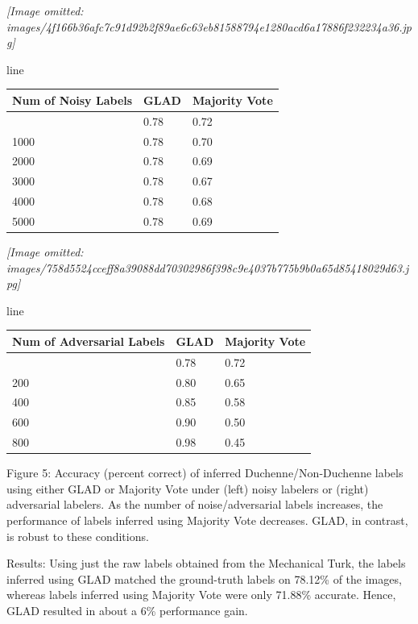\documentclass[
]{article}
\newcounter{none} %
\begin{document}
\textit{[Image omitted: images/4f166b36afc7c91d92b2f89ae6c63eb81588794e1280acd6a17886f232234a36.jpg]}

line

{\def\LTcaptype{none} %
\begin{longtable}[]{@{}lll@{}}
\toprule\noalign{}
Num of Noisy Labels & GLAD & Majority Vote \\
\midrule\noalign{}
\endhead
\bottomrule\noalign{}
\endlastfoot
0 & 0.78 & 0.72 \\
1000 & 0.78 & 0.70 \\
2000 & 0.78 & 0.69 \\
3000 & 0.78 & 0.67 \\
4000 & 0.78 & 0.68 \\
5000 & 0.78 & 0.69 \\
\end{longtable}
}

\textit{[Image omitted: images/758d5524cceff8a39088dd70302986f398c9e4037b775b9b0a65d85418029d63.jpg]}

line

{\def\LTcaptype{none} %
\begin{longtable}[]{@{}lll@{}}
\toprule\noalign{}
Num of Adversarial Labels & GLAD & Majority Vote \\
\midrule\noalign{}
\endhead
\bottomrule\noalign{}
\endlastfoot
0 & 0.78 & 0.72 \\
200 & 0.80 & 0.65 \\
400 & 0.85 & 0.58 \\
600 & 0.90 & 0.50 \\
800 & 0.98 & 0.45 \\
\end{longtable}
}

Figure 5: Accuracy (percent correct) of inferred Duchenne/Non-Duchenne
labels using either GLAD or Majority Vote under (left) noisy labelers or
(right) adversarial labelers. As the number of noise/adversarial labels
increases, the performance of labels inferred using Majority Vote
decreases. GLAD, in contrast, is robust to these conditions.

Results: Using just the raw labels obtained from the Mechanical Turk,
the labels inferred using GLAD matched the ground-truth labels on
78.12\% of the images, whereas labels inferred using Majority Vote were
only 71.88\% accurate. Hence, GLAD resulted in about a 6\% performance
gain.
\end{document}

